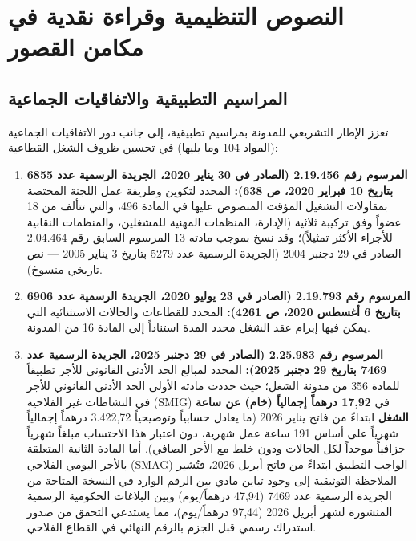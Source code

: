 \section{النصوص التنظيمية وقراءة نقدية في مكامن القصور}

\subsection{المراسيم التطبيقية والاتفاقيات الجماعية}
تعزز الإطار التشريعي للمدونة بمراسيم تطبيقية، إلى جانب دور الاتفاقيات الجماعية (المواد \textenglish{104} وما يليها) في تحسين ظروف الشغل القطاعية:
\begin{enumerate}[leftmargin=*, itemsep=5pt]
    \item \textbf{المرسوم رقم \textenglish{2.19.456} (الصادر في \textenglish{30} يناير \textenglish{2020}، الجريدة الرسمية عدد \textenglish{6855} بتاريخ \textenglish{10} فبراير \textenglish{2020}، ص \textenglish{638}):} المحدد لتكوين وطريقة عمل اللجنة المختصة بمقاولات التشغيل المؤقت المنصوص عليها في المادة \textenglish{496}، والتي تتألف من \textenglish{18} عضواً وفق تركيبة ثلاثية (الإدارة، المنظمات المهنية للمشغلين، والمنظمات النقابية للأجراء الأكثر تمثيلاً)؛ وقد نسخ بموجب مادته \textenglish{13} المرسوم السابق رقم \textenglish{2.04.464} الصادر في \textenglish{29} دجنبر \textenglish{2004} (الجريدة الرسمية عدد \textenglish{5279} بتاريخ \textenglish{3} يناير \textenglish{2005} --- نص تاريخي منسوخ).
    \item \textbf{المرسوم رقم \textenglish{2.19.793} (الصادر في \textenglish{23} يوليو \textenglish{2020}، الجريدة الرسمية عدد \textenglish{6906} بتاريخ \textenglish{6} أغسطس \textenglish{2020}، ص \textenglish{4261}):} المحدد للقطاعات والحالات الاستثنائية التي يمكن فيها إبرام عقد الشغل محدد المدة استناداً إلى المادة \textenglish{16} من المدونة.
    \item \textbf{المرسوم رقم \textenglish{2.25.983} (الصادر في \textenglish{29} دجنبر \textenglish{2025}، الجريدة الرسمية عدد \textenglish{7469} بتاريخ \textenglish{29} دجنبر \textenglish{2025}):} المحدد لمبالغ الحد الأدنى القانوني للأجر تطبيقاً للمادة \textenglish{356} من مدونة الشغل؛ حيث حددت مادته الأولى الحد الأدنى القانوني للأجر في النشاطات غير الفلاحية (\textenglish{SMIG}) في \textbf{\textenglish{17,92} درهماً إجمالياً (خام) عن ساعة الشغل} ابتداءً من فاتح يناير \textenglish{2026} (ما يعادل حسابياً وتوضيحياً \textenglish{3.422,72} درهماً إجمالياً شهرياً على أساس \textenglish{191} ساعة عمل شهرية، دون اعتبار هذا الاحتساب مبلغاً شهرياً جزافياً موحداً لكل الحالات ودون خلط مع الأجر الصافي). أما المادة الثانية المتعلقة بالأجر اليومي الفلاحي (\textenglish{SMAG}) الواجب التطبيق ابتداءً من فاتح أبريل \textenglish{2026}، فتُشير الملاحظة التوثيقية إلى وجود تباين مادي بين الرقم الوارد في النسخة المتاحة من الجريدة الرسمية عدد \textenglish{7469} (\textenglish{47,94} درهماً/يوم) وبين البلاغات الحكومية الرسمية المنشورة لشهر أبريل \textenglish{2026} (\textenglish{97,44} درهماً/يوم)، مما يستدعي التحقق من صدور استدراك رسمي قبل الجزم بالرقم النهائي في القطاع الفلاحي.
\end{enumerate}

